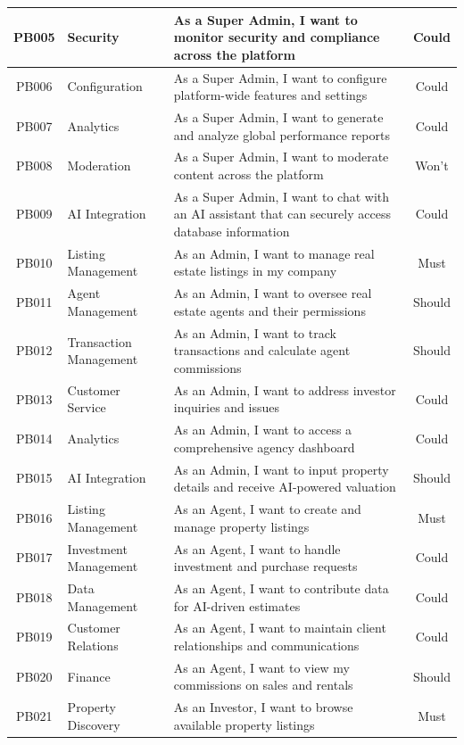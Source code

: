 \begin{longtable}{|c|l|p{8cm}|c|}
    PB005 & Security & As a Super Admin, I want to monitor security and compliance across the platform & Could \\
    \hline
    PB006 & Configuration & As a Super Admin, I want to configure platform-wide features and settings & Could \\
    \hline
    PB007 & Analytics & As a Super Admin, I want to generate and analyze global performance reports & Could \\
    \hline
    PB008 & Moderation & As a Super Admin, I want to moderate content across the platform & Won't \\
    \hline
    PB009 & AI Integration & As a Super Admin, I want to chat with an AI assistant that can securely access database information & Could \\
    \hline
    PB010 & Listing Management & As an Admin, I want to manage real estate listings in my company & Must \\
    \hline
    PB011 & Agent Management & As an Admin, I want to oversee real estate agents and their permissions & Should \\
    \hline
    PB012 & Transaction Management & As an Admin, I want to track transactions and calculate agent commissions & Should \\
    \hline
    PB013 & Customer Service & As an Admin, I want to address investor inquiries and issues & Could \\
    \hline
    PB014 & Analytics & As an Admin, I want to access a comprehensive agency dashboard & Could \\
    \hline
    PB015 & AI Integration & As an Admin, I want to input property details and receive AI-powered valuation & Should \\
    \hline
    PB016 & Listing Management & As an Agent, I want to create and manage property listings & Must \\
    \hline
    PB017 & Investment Management & As an Agent, I want to handle investment and purchase requests & Could \\
    \hline
    PB018 & Data Management & As an Agent, I want to contribute data for AI-driven estimates & Could \\
    \hline
    PB019 & Customer Relations & As an Agent, I want to maintain client relationships and communications & Could \\
    \hline
    PB020 & Finance & As an Agent, I want to view my commissions on sales and rentals & Should \\
    \hline
    PB021 & Property Discovery & As an Investor, I want to browse available property listings & Must \\

\end{longtable}
